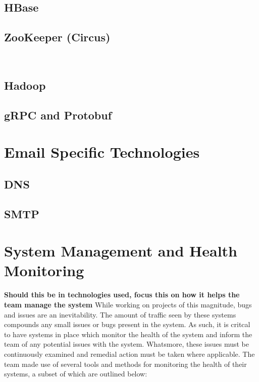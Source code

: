 \subsection{HBase}

\subsection{ZooKeeper (Circus)}\

\subsection{Hadoop}

\subsection{gRPC and Protobuf}


\section{Email Specific Technologies}
\subsection{DNS}
\subsection{SMTP}

\section{System Management and Health Monitoring}
\textbf{Should this be in technologies used, focus this on how it helps the team manage the system}
While working on projects of this magnitude, bugs and issues are an inevitability. The amount of traffic seen by these systems compounds any small issues or bugs present in the system. As such, it is critcal to have systems in place which monitor the health of the system and inform the team of any potential issues with the system. Whatsmore, these issues must be continuously examined and remedial action must be taken where applicable. The \team{} team made use of several tools and methods for monitoring the health of their systems, a subset of which are outlined below:

